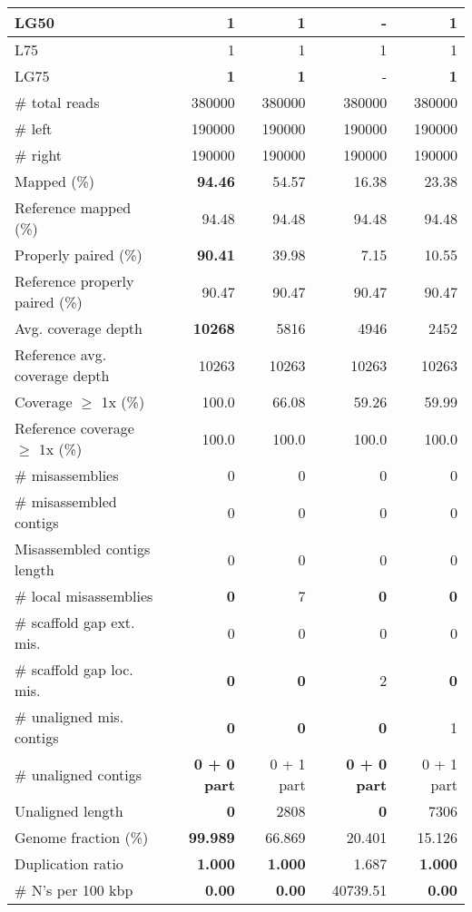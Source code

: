 \documentclass[12pt,a4paper]{article}
\begin{document}
\begin{table}[ht]
\begin{center}
\begin{tabular}{|l*{4}{|r}|}
LG50 & {\bf 1} & {\bf 1} & - & {\bf 1} \\ \hline
L75 & 1 & 1 & 1 & 1 \\ \hline
LG75 & {\bf 1} & {\bf 1} & - & {\bf 1} \\ \hline
\# total reads & 380000 & 380000 & 380000 & 380000 \\ \hline
\# left & 190000 & 190000 & 190000 & 190000 \\ \hline
\# right & 190000 & 190000 & 190000 & 190000 \\ \hline
Mapped (\%) & {\bf 94.46} & 54.57 & 16.38 & 23.38 \\ \hline
Reference mapped (\%) & 94.48 & 94.48 & 94.48 & 94.48 \\ \hline
Properly paired (\%) & {\bf 90.41} & 39.98 & 7.15 & 10.55 \\ \hline
Reference properly paired (\%) & 90.47 & 90.47 & 90.47 & 90.47 \\ \hline
Avg. coverage depth & {\bf 10268} & 5816 & 4946 & 2452 \\ \hline
Reference avg. coverage depth & 10263 & 10263 & 10263 & 10263 \\ \hline
Coverage $\geq$ 1x (\%) & 100.0 & 66.08 & 59.26 & 59.99 \\ \hline
Reference coverage $\geq$ 1x (\%) & 100.0 & 100.0 & 100.0 & 100.0 \\ \hline
\# misassemblies & 0 & 0 & 0 & 0 \\ \hline
\# misassembled contigs & 0 & 0 & 0 & 0 \\ \hline
Misassembled contigs length & 0 & 0 & 0 & 0 \\ \hline
\# local misassemblies & {\bf 0} & 7 & {\bf 0} & {\bf 0} \\ \hline
\# scaffold gap ext. mis. & 0 & 0 & 0 & 0 \\ \hline
\# scaffold gap loc. mis. & {\bf 0} & {\bf 0} & 2 & {\bf 0} \\ \hline
\# unaligned mis. contigs & {\bf 0} & {\bf 0} & {\bf 0} & 1 \\ \hline
\# unaligned contigs & {\bf 0 + 0 part} & 0 + 1 part & {\bf 0 + 0 part} & 0 + 1 part \\ \hline
Unaligned length & {\bf 0} & 2808 & {\bf 0} & 7306 \\ \hline
Genome fraction (\%) & {\bf 99.989} & 66.869 & 20.401 & 15.126 \\ \hline
Duplication ratio & {\bf 1.000} & {\bf 1.000} & 1.687 & {\bf 1.000} \\ \hline
\# N's per 100 kbp & {\bf 0.00} & {\bf 0.00} & 40739.51 & {\bf 0.00} \\ \hline

\end{tabular}
\end{center}
\end{table}
\end{document}
